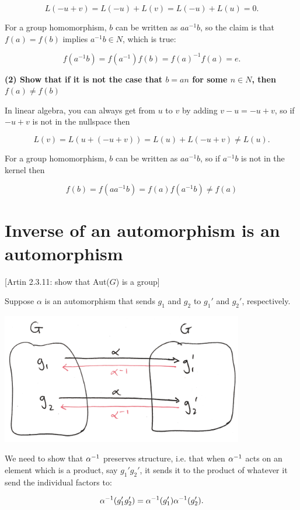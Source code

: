 $$
L(-u + v) = L(-u) + L(v) = L(-u) + L(u) = 0.
$$

For a group homomorphism, $b$ can be written as $aa^{-1}b$, so the claim is
that $f(a) = f(b)$ implies $a^{-1}b \in N$, which is true:

$$
f(a^{-1}b) = f(a^{-1})f(b) = f(a)^{-1}f(a) = e.
$$

\textbf{(2) Show that if it is not the case that $b = an$ for some $n \in N$, then $f(a) \neq f(b)$}

In linear algebra, you can always get from $u$ to $v$ by adding $v - u = -u + v$,
so if $-u + v$ is not in the nullspace then

$$
L(v) = L(u + (-u + v)) = L(u) + L(-u + v) \neq L(u).
$$

For a group homomorphism, $b$ can be written as $aa^{-1}b$, so if $a^{-1}b$ is
not in the kernel then

$$
f(b) = f(aa^{-1}b) = f(a)f(a^{-1}b) \neq f(a)
$$


\section{Inverse of an automorphism is an automorphism}

[Artin 2.3.11: show that Aut($G$) is a group]

Suppose $\alpha$ is an automorphism that sends $g_1$ and $g_2$ to $g_1'$ and
$g_2'$, respectively.

\begin{mdframed}
\includegraphics[width=300pt]{img/inverse-of-automorphism-1.png}
\end{mdframed}

We need to show that $\alpha^{-1}$ preserves structure, i.e. that when $\alpha^{-1}$ acts
on an element which is a product, say $g_1'g_2'$, it sends it to the product of
whatever it send the individual factors to:

$$
\alpha^{-1}(g_1'g_2') = \alpha^{-1}(g_1')\alpha^{-1}(g_2').
$$


